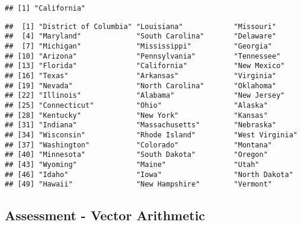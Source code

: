 \documentclass[
]{article}
\newenvironment{Shaded}{\begin{snugshade}}{\end{snugshade}}
\newcommand{\CommentTok}[1]{\textcolor[rgb]{0.56,0.35,0.01}{\textit{#1}}}
\newcommand{\DataTypeTok}[1]{\textcolor[rgb]{0.13,0.29,0.53}{#1}}
\newcommand{\DecValTok}[1]{\textcolor[rgb]{0.00,0.00,0.81}{#1}}
\newcommand{\KeywordTok}[1]{\textcolor[rgb]{0.13,0.29,0.53}{\textbf{#1}}}
\newcommand{\NormalTok}[1]{#1}
\newcommand{\OperatorTok}[1]{\textcolor[rgb]{0.81,0.36,0.00}{\textbf{#1}}}
\newcommand{\OtherTok}[1]{\textcolor[rgb]{0.56,0.35,0.01}{#1}}
\newcommand{\StringTok}[1]{\textcolor[rgb]{0.31,0.60,0.02}{#1}}
\begin{document}
\begin{verbatim}
## [1] "California"
\end{verbatim}

\begin{Shaded}
\end{Shaded}

\begin{verbatim}
##  [1] "District of Columbia" "Louisiana"            "Missouri"            
##  [4] "Maryland"             "South Carolina"       "Delaware"            
##  [7] "Michigan"             "Mississippi"          "Georgia"             
## [10] "Arizona"              "Pennsylvania"         "Tennessee"           
## [13] "Florida"              "California"           "New Mexico"          
## [16] "Texas"                "Arkansas"             "Virginia"            
## [19] "Nevada"               "North Carolina"       "Oklahoma"            
## [22] "Illinois"             "Alabama"              "New Jersey"          
## [25] "Connecticut"          "Ohio"                 "Alaska"              
## [28] "Kentucky"             "New York"             "Kansas"              
## [31] "Indiana"              "Massachusetts"        "Nebraska"            
## [34] "Wisconsin"            "Rhode Island"         "West Virginia"       
## [37] "Washington"           "Colorado"             "Montana"             
## [40] "Minnesota"            "South Dakota"         "Oregon"              
## [43] "Wyoming"              "Maine"                "Utah"                
## [46] "Idaho"                "Iowa"                 "North Dakota"        
## [49] "Hawaii"               "New Hampshire"        "Vermont"
\end{verbatim}

\hypertarget{assessment---vector-arithmetic}{%
\subsection{Assessment - Vector
Arithmetic}\label{assessment---vector-arithmetic}}
\end{document}
